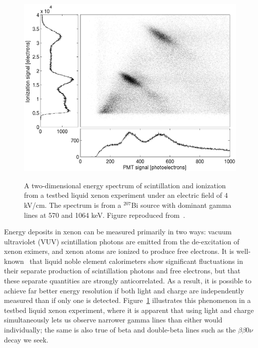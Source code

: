 \begin{figure}
\begin{center}
\includegraphics[keepaspectratio=true,width=\textwidth]{4kV_correl1.eps}
\end{center}
\renewcommand{\baselinestretch}{1}
\small\normalsize
\begin{quote}
\caption{A two-dimensional energy spectrum of scintillation and ionization from a testbed liquid xenon experiment under an electric field of $4$ kV/cm.  The spectrum is from a $^{207}$Bi source with dominant gamma lines at 570 and 1064 keV.  Figure reproduced from~\cite{PhysRevB.68.054201}.}
\label{fig:AnticorrelationInXenon}
\end{quote}
\end{figure}
\renewcommand{\baselinestretch}{2}
\small\normalsize

Energy deposits in xenon can be measured primarily in two ways: vacuum ultraviolet (VUV) scintillation photons are emitted from the de-excitation of xenon eximers, and xenon atoms are ionized to produce free electrons.  It is well-known~\cite{PhysRevB.68.054201} that liquid noble element calorimeters show significant fluctuations in their separate production of scintillation photons and free electrons, but that these separate quantities are strongly anticorrelated.  As a result, it is possible to achieve far better energy resolution if both light and charge are independently measured than if only one is detected. Figure~\ref{fig:AnticorrelationInXenon} illustrates this phenomenon in a testbed liquid xenon experiment, where it is apparent that using light and charge simultaneously lets us observe narrower gamma lines than either would individually; the same is also true of beta and double-beta lines such as the $\beta\beta 0\nu$ decay we seek.

